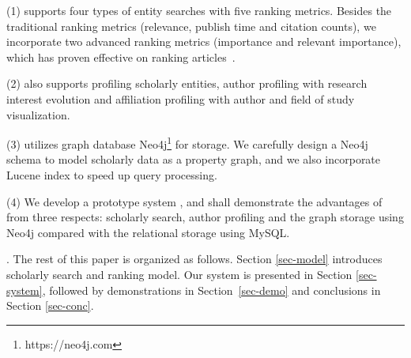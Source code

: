 \noindent (1) \oursystem supports four types of entity searches with five ranking metrics. Besides the traditional ranking metrics (relevance, publish time and citation counts), we incorporate two advanced ranking metrics (importance and relevant importance), which has proven effective on ranking articles~\cite{ma2018query}.

\noindent (2) \oursystem also supports profiling scholarly entities, \eg author profiling with research interest evolution and affiliation profiling with author and field of study visualization.

\noindent  (3) \oursystem utilizes graph database Neo4j\footnote{https://neo4j.com} for storage. We carefully design a Neo4j schema to model scholarly data as a property graph, and we also incorporate Lucene index to speed up query processing.

\noindent (4) We develop a prototype system \oursystem, and shall demonstrate the advantages of \oursystem from three respects: scholarly search, author profiling and the graph storage using Neo4j compared with the relational storage using MySQL. %



.
The rest of this paper is organized as follows. Section \ref{sec-model} introduces scholarly search and ranking model. Our \oursystem system is presented in Section \ref{sec-system}, followed by demonstrations in Section~\ref{sec-demo} and conclusions in Section \ref{sec-conc}.






